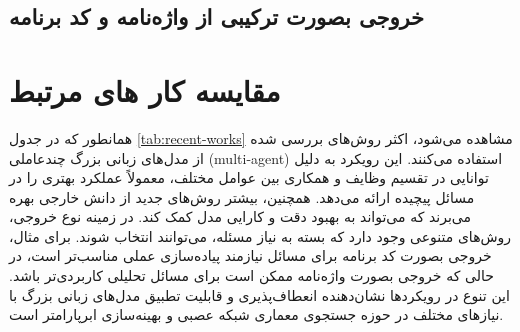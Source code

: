 \subsection{خروجی بصورت ترکیبی از واژه‌نامه و کد برنامه}
\section{مقایسه کار های مرتبط}
همانطور که در جدول \ref{tab:recent-works} مشاهده می‌شود، اکثر روش‌های بررسی شده از مدل‌های زبانی بزرگ چندعاملی (multi-agent) استفاده می‌کنند. این رویکرد به دلیل توانایی در تقسیم وظایف و همکاری بین عوامل مختلف، معمولاً عملکرد بهتری را در مسائل پیچیده ارائه می‌دهد. همچنین، بیشتر روش‌های جدید از دانش خارجی بهره می‌برند که می‌تواند به بهبود دقت و کارایی مدل کمک کند. در زمینه نوع خروجی، روش‌های متنوعی وجود دارد که بسته به نیاز مسئله، می‌توانند انتخاب شوند. برای مثال، خروجی بصورت کد برنامه برای مسائل نیازمند پیاده‌سازی عملی مناسب‌تر است، در حالی که خروجی بصورت واژه‌نامه ممکن است برای مسائل تحلیلی کاربردی‌تر باشد. این تنوع در رویکردها نشان‌دهنده انعطاف‌پذیری و قابلیت تطبیق مدل‌های زبانی بزرگ با نیازهای مختلف در حوزه جستجوی معماری شبکه عصبی و بهینه‌سازی ابرپارامتر است.


